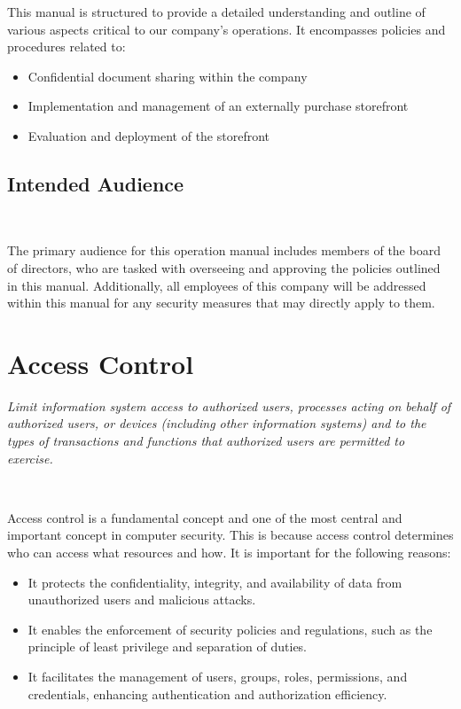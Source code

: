 \documentclass[12pt,a4paper]{report}
\begin{document}
This manual is structured to provide a detailed understanding and outline of various aspects critical to our company's operations. 
It encompasses policies and procedures related to:
\begin{itemize}
	\item Confidential document sharing within the company
	\item Implementation and management of an externally purchase storefront
	\item Evaluation and deployment of the storefront
\end{itemize}

\section{Intended Audience}
\

The primary audience for this operation manual includes members of the board of directors, who are tasked with overseeing and approving the policies outlined in this manual.
Additionally, all employees of this company will be addressed within this manual for any security measures that may directly apply to them.

\chapter{Access Control}
\textit{Limit information system access to authorized users, processes acting on behalf of authorized users, or devices (including other information systems) and to the types of transactions and functions that authorized users are permitted to exercise.}

\

Access control is a fundamental concept and one of the most central and important concept in computer security. This is because access control determines who can access what resources and how. It is important for the following reasons:
\begin{itemize}
 \item It protects the confidentiality, integrity, and availability of data from unauthorized users and malicious attacks.
 \item It enables the enforcement of security policies and regulations, such as the principle of least privilege and separation of duties.
 \item It facilitates the management of users, groups, roles, permissions, and credentials, enhancing authentication and authorization efficiency.
\end{itemize}
\end{document}
